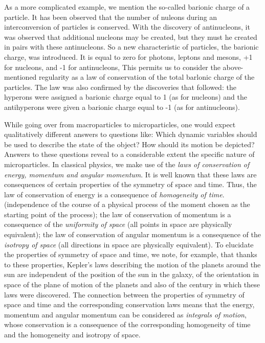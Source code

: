 \documentclass[a4paper,sfsidenotes,colorlinks=true]{tufte-book}
\numberwithin{equation}{section}
\numberwithin{figure}{section}
\begin{document}
\begin{fullwidth}
\setlength{\leftskip}{3cm}
\textsf{\small As a more complicated example, we mention the so-called barionic
charge of a particle. It has been observed that the number of nuleons
during an interconversion of particles is conserved. With the
discovery of antinucleons, it was observed that additional nucleons
may be created, but they must he created in pairs with these
antinucleons. So a new characteristic of particles, the barionic
charge, was introduced. It is equal to zero for photons, leptons and
mesons, +1 for nucleons, and -1 for antinucleons, This permits us to
consider the above-mentioned regularity as a law of conservation of
the total barlonic charge of the particles. The law was also confirmed
by the discoveries that followed: the hyperons were assigned a
barionic charge equal to 1 (as for nucleons) and the antihyperons were
given a barionic charge equal to -1 (as for antinucleons).}

\end{fullwidth}
\vspace{5pt}
\setlength{\leftskip}{0pt}

While going over from macroparticles to microparticles, one would
expect qualitatively different answers to questions like: Which
dynamic variables should be used to describe the state of the object?
How should its motion be depicted? Answers to these questions reveal
to a considerable extent the specific nature of microparticles. In
classical physics, we make use of the \emph{laws of conservation of
  energy, momentum and angular momentum}. It is well known that these
laws are consequences of certain properties of the symmetry of space
and time. Thus, the law of conservation of energy is a consequence of
\emph{homogeneity of time}. (independence of the course of a physical
process of the moment chosen as the starting point of the process);
the law of conservation of momentum is a consequence of the
\emph{uniformity of space} (all points in space are physically
equivalent); the law of conservation of angular momentum is a
consequence of the \emph{isotropy of space} (all directions in space
are physically equivalent). To elucidate the properties of symmetry of
space and time, we note, for example, that thanks to these properties,
Kepler's laws describing the motion of the planets around the sun are
independent of the position of the sun in the galaxy, of the
orientation in space of the plane of motion of the planets and also of
the century in which these laws were discovered. The connection
between the properties of symmetry of space and time and the
corresponding conservation laws means that the energy, momentum and
angular momentum can be considered as \emph{integrals of motion},
whose conservation is a consequence of the corresponding homogeneity
of time and the homogeneity and isotropy of space.
\end{document}
